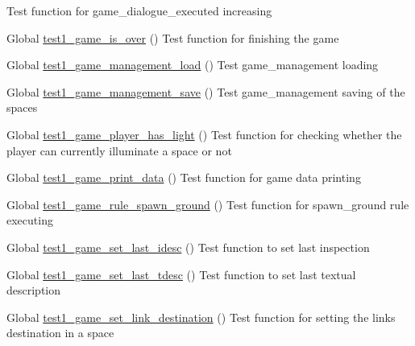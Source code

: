 \begin{DoxyRefList}
%
Test function for game\+\_\+dialogue\+\_\+executed increasing  
\item[Global \mbox{\hyperlink{game__test_8c_a6ab3378c3e627b8ff5cb397ecb46d268}{test1\+\_\+game\+\_\+is\+\_\+over}} ()]\label{test__test000146}%
%
Test function for finishing the game  
\item[Global \mbox{\hyperlink{game__management__test_8c_ac35aa469cb2dbc5eb072c19fbc6e0970}{test1\+\_\+game\+\_\+management\+\_\+load}} ()]\label{test__test000109}%
%
Test game\+\_\+management loading  
\item[Global \mbox{\hyperlink{game__management__test_8c_a2d6ccbade0292cbdf325b04dbd8b45c2}{test1\+\_\+game\+\_\+management\+\_\+save}} ()]\label{test__test000123}%
%
Test game\+\_\+management saving of the spaces  
\item[Global \mbox{\hyperlink{game__test_8c_ad43df6d25b9a67321bf0a2d599f1a249}{test1\+\_\+game\+\_\+player\+\_\+has\+\_\+light}} ()]\label{test__test000170}%
%
Test function for checking whether the player can currently illuminate a space or not  
\item[Global \mbox{\hyperlink{game__test_8c_a66c7d4175923174d1cc9d0b8e672746f}{test1\+\_\+game\+\_\+print\+\_\+data}} ()]\label{test__test000148}%
%
Test function for game data printing  
\item[Global \mbox{\hyperlink{game__test_8c_abc0f70af7629a0af5c4c634cb7e750f4}{test1\+\_\+game\+\_\+rule\+\_\+spawn\+\_\+ground}} ()]\label{test__test000411}%
%
Test function for spawn\+\_\+ground rule executing  
\item[Global \mbox{\hyperlink{game__test_8c_a7055ae50e0f839a444e036d5725cb9e8}{test1\+\_\+game\+\_\+set\+\_\+last\+\_\+idesc}} ()]\label{test__test000284}%
%
Test function to set last inspection  
\item[Global \mbox{\hyperlink{game__test_8c_ab4c6630c5f4e698d9a09d355c466ab86}{test1\+\_\+game\+\_\+set\+\_\+last\+\_\+tdesc}} ()]\label{test__test000280}%
%
Test function to set last textual description  
\item[Global \mbox{\hyperlink{game__test_8c_ab21cf19276dfd89f07c3c8b0ddb88689}{test1\+\_\+game\+\_\+set\+\_\+link\+\_\+destination}} ()]\label{test__test000249}%
%
Test function for setting the link\textquotesingle{}s destination in a space  

\end{DoxyRefList}
